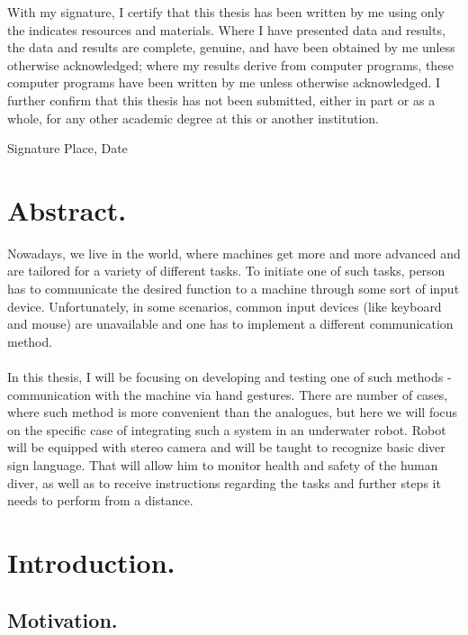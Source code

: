 \documentclass[a4paper,11pt,oneside]{article}
\begin{document}
  With my signature, I certify that this thesis has been written by me
  using only the indicates resources and materials. Where I have
  presented data and results, the data and results are complete,
  genuine, and have been obtained by me unless otherwise acknowledged;
  where my results derive from computer programs, these computer
  programs have been written by me unless otherwise acknowledged. I
  further confirm that this thesis has not been submitted, either in
  part or as a whole, for any other academic degree at this or another
  institution.

  \vspace{20mm}

  Signature \hfill Place, Date

  \newpage

  \section*{Abstract.}
  
  Nowadays, we live in the world, where machines get more and more advanced and are tailored for a variety of different tasks. To initiate one of such tasks, person has to communicate the desired function to a machine through some sort of input device. Unfortunately, in some scenarios, common input devices (like keyboard and mouse) are unavailable and one has to implement a different communication method.\\
  \\
  In this thesis, I will be focusing on developing and testing one of such methods - communication with the machine via hand gestures. There are number of cases, where such method is more convenient than the analogues, but here we will focus on the specific case of integrating such a system in an underwater robot. Robot will be equipped with stereo camera and will be taught to recognize basic diver sign language. That will allow him to monitor health and safety of the human diver, as well as to receive instructions regarding the tasks and further steps it needs to perform from a distance. 

  \newpage
  \tableofcontents

  \clearpage

  \section{Introduction.}
  
  \subsection{Motivation.}
  
\end{document}
